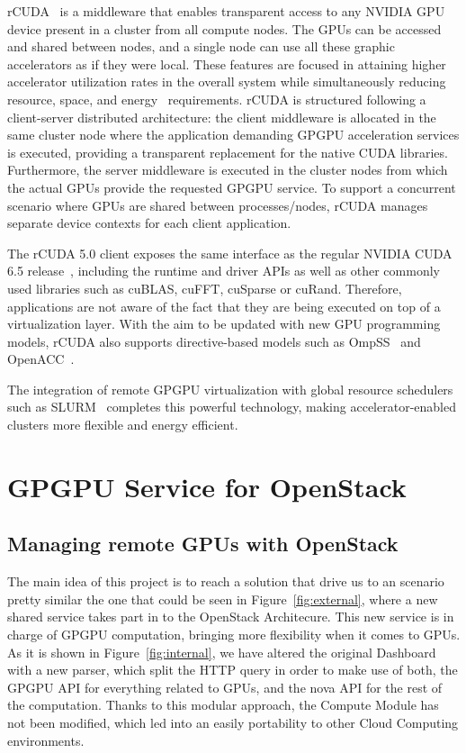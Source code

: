\documentclass[a4paper,twoside]{article}
\begin{document}
{rCUDA}~\cite{tonithesis,toniparco} is a middleware that enables transparent access
to any NVIDIA GPU device present in a cluster from all compute
nodes. The GPUs can be accessed and shared between nodes, and a single node can use all these graphic accelerators
as if they were local.
These features are focused in attaining higher accelerator utilization rates in the overall system while simultaneously reducing
resource, space, and energy~\cite{energy14} requirements.
rCUDA is structured following a client-server distributed
architecture: the client middleware is allocated in the same cluster node where the application demanding GPGPU
acceleration services is executed, providing a transparent replacement for the
native CUDA libraries. Furthermore, the server middleware is executed in the
cluster nodes from which the actual GPUs provide the requested GPGPU service.
To support a concurrent scenario where GPUs are shared between
processes\slash nodes, {rCUDA} manages separate device contexts for
each client application.

The {rCUDA} 5.0 client exposes the same interface as the regular NVIDIA
CUDA 6.5 release~\cite{cuda65}, including the runtime and driver
APIs as well as other commonly used libraries such as cuBLAS, cuFFT, cuSparse or cuRand.
Therefore, applications are not aware of the fact that they are being executed
on top of a virtualization layer.
With the aim to be updated with new GPU programming models, {rCUDA} also supports
directive-based models such as OmpSS~\cite{repara15} and OpenACC~\cite{cluster15}.

The integration of remote GPGPU virtualization with global
resource schedulers such as SLURM~\cite{sbacpad14} completes this powerful
technology, making accelerator-enabled clusters more flexible and
energy efficient.


\section{GPGPU Service for OpenStack}
\subsection{Managing remote GPUs with OpenStack}
The main idea of this project is to reach a solution that drive us to an scenario pretty similar the one that could be seen in Figure~\ref{fig:external}, where a new shared service takes part in to the OpenStack Architecure.
This new service is in charge of GPGPU computation, bringing more flexibility when it comes to GPUs.
As it is shown in Figure~\ref{fig:internal}, we have altered the original Dashboard with a new parser, 
which split the HTTP query in order to make use of both, the GPGPU API for everything related to GPUs, and the nova API for the rest of the computation. 
Thanks to this modular approach, the Compute Module has not been modified, which led into an easily portability to other Cloud Computing environments.
\end{document}
